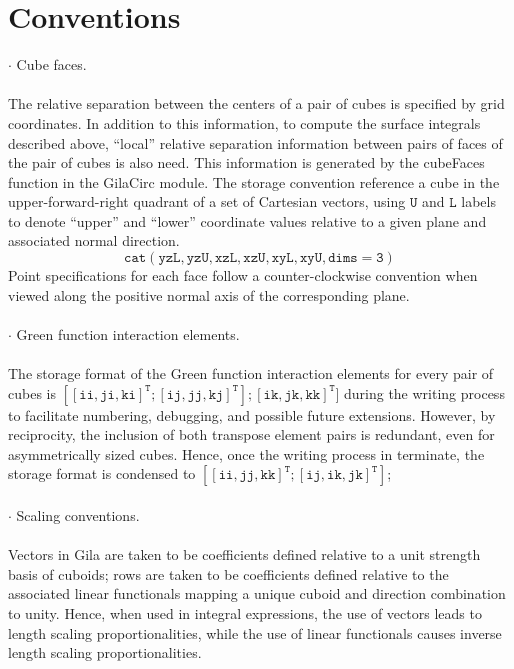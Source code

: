 \documentclass[reprint,aps,prb]{revtex4-2}
\begin{document}
\section{Conventions} \label{conventions}
\noindent
$\cdot$ Cube faces. 
\\ \\
The relative separation between the centers of a pair of cubes is specified by grid coordinates. 
In addition to this information, to compute the surface integrals described above, ``local'' relative separation information between pairs of faces of the pair of cubes is also need. 
This information is generated by the cubeFaces function in the GilaCirc module. 
The storage convention reference a cube in the upper-forward-right quadrant of a set of Cartesian vectors, using $\mathtt{U}$ and $\mathtt{L}$ labels to denote ``upper'' and ``lower'' coordinate values relative to a given plane and associated normal direction. 
$$
	\mathtt{cat(yzL, yzU, xzL, xzU, xyL, xyU, dims = 3)}
$$
Point specifications for each face follow a counter-clockwise convention when viewed along the positive normal axis of the corresponding plane. 
\\ \\
$\cdot$ Green function interaction elements. 
\\ \\
The storage format of the Green function interaction elements for every pair of cubes is $\mathtt{[[ii, ji, ki]^{T}; [ij, jj, kj]^{T}] ; [ik, jk, kk]^{T}]}$ during the writing process to facilitate numbering, debugging, and possible future extensions. 
However, by reciprocity, the inclusion of both transpose element pairs is redundant, even for asymmetrically sized cubes. 
Hence, once the writing process in terminate, the storage format is condensed to $\mathtt{[[ii, jj, kk]^{T}; [ij, ik, jk]^{T}]}$;
\\ \\
$\cdot$ Scaling conventions. 
\\ \\ 
Vectors in Gila are taken to be coefficients defined relative to a unit strength basis of cuboids; rows are taken to be coefficients defined relative to the associated linear functionals mapping a unique cuboid and direction combination to unity. 
Hence, when used in integral expressions, the use of vectors leads to length scaling proportionalities, while the use of linear functionals causes inverse length scaling proportionalities. 
\\ \\
\end{document}
